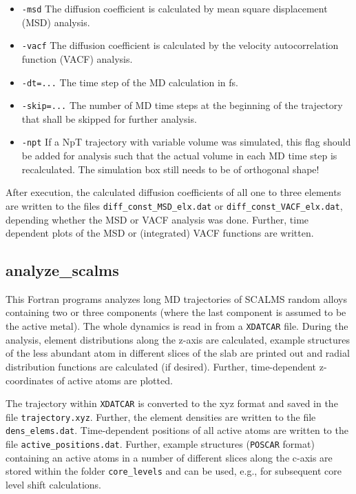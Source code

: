 \documentclass[a4paper,11pt]{article}
\begin{document}
\begin{itemize}
 \item \texttt{-msd} The diffusion coefficient is calculated by
 mean square displacement (MSD) analysis.
 \item \texttt{-vacf} The diffusion coefficient is calculated
 by the velocity autocorrelation function (VACF) analysis.
 \item \texttt{-dt=...} The time step of the MD calculation in fs.
 \item \texttt{-skip=...} The number of MD time steps at the beginning
 of the trajectory that shall be skipped for further analysis.
 \item \texttt{-npt} If a NpT trajectory with variable volume was
 simulated, this flag should be added for analysis such that the
 actual volume in each MD time step is recalculated. The simulation
 box still needs to be of orthogonal shape!
\end{itemize}

After execution, the calculated diffusion coefficients of all
one to three elements are written to the files \texttt{diff\_const\_MSD\_elx.dat} or
\texttt{diff\_const\_VACF\_elx.dat}, depending whether the MSD
or VACF analysis was done. Further, time dependent plots of the
MSD or (integrated) VACF functions are written.


\subsection{analyze\_scalms}\label{analyze_scalms}

This Fortran programs analyzes long MD trajectories of SCALMS random
alloys containing two or three components (where the last component is assumed
to be the active metal).
The whole dynamics is read in from a \texttt{XDATCAR} file.
During the analysis, element distributions along the z-axis are 
calculated, example structures of the less abundant atom in different 
slices of the slab are printed out and radial distribution functions 
are calculated (if desired).
Further, time-dependent z-coordinates of active atoms are 
plotted.

The trajectory within \texttt{XDATCAR} is converted to the xyz format
and saved in the file \texttt{trajectory.xyz}.
Further, the element densities are written to the file \texttt{dens\_elems.dat}.
Time-dependent positions of all active atoms are written to the file
\texttt{active\_positions.dat}.
Further, example structures (\texttt{POSCAR} format) containing an active atoms in a number of
different slices along the c-axis are stored within the folder
\texttt{core\_levels} and can be used, e.g., for subsequent
core level shift calculations.
\end{document}
